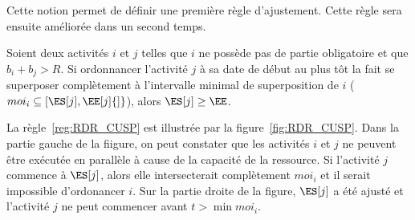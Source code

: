 Cette notion permet de définir une première règle d'ajustement. Cette
règle sera ensuite améliorée dans un second temps. 

\begin{reg}
\label{reg:RDR_CUSP}
  Soient deux activités $i$ et $j$ telles que $i$ ne possède pas de
  partie obligatoire et que $b_i+b_j > R$. Si ordonnancer l'activité
 $j$ à sa date de début au plus tôt la fait se superposer complètement
 à l’intervalle minimal de superposition de $i$ ($moi_i \subseteq
 [\ES[j],\EE[j]{]}$), alors $\ES[j] \ge \EE$.
\end{reg}

\begin{ex}
La règle~\ref{reg:RDR_CUSP} est illustrée par la
figure~\ref{fig:RDR_CUSP}. Dans la partie gauche de la fiigure, on
peut constater que les activités $i$ et $j$ ne peuvent être exécutée
en parallèle à cause de la capacité de la ressource. Si l'activité $j$
commence à $\ES[j]$, alors elle intersecterait complètement $moi_i$ et
il serait impossible d'ordonancer $i$. Sur la partie droite de la
figure, $\ES[j]$ a été ajusté et l'activité $j$ ne peut commencer
avant $t > \min{moi_i}$.

  \begin{figure}[!htb]
    \centering
\end{figure}
\end{ex}
